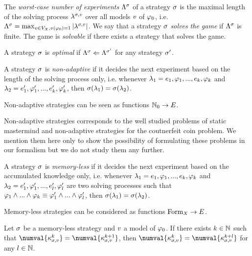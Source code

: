 
The \emph{worst-case number of experiments} $\Lambda^{\sigma}$
  of a strategy $\sigma$ is the maximal length of the solving process
  $\lambda^{\sigma,v}$ over all models $v$ of $\varphi_0$, i.e.
  $\Lambda^{\sigma} = \max_{v\in V_X, v(\varphi_0) = 1} |\lambda^{\sigma,v}|$.
We say that a strategy $\sigma$ \emph{solves the game} if $\Lambda^{\sigma}$ is finite.
The game is \emph{solvable} if there exists a strategy that solves the game.


\begin{definition}
A strategy $\sigma$ is \emph{optimal} if
  $\Lambda^{\sigma} <= \Lambda^{\sigma'}$ for any strategy $\sigma'$.
\end{definition}

\begin{definition}
A strategy $\sigma$ is \emph{non-adaptive} if it decides the next experiment
  based on the length of the solving process only, i.e.
  whenever
  $\lambda_1 = e_1, \varphi_1, ..., e_k, \varphi_k$ and
  $\lambda_2 = e'_1, \varphi'_1, ..., e'_k, \varphi'_k$,
  then $\sigma(\lambda_1) = \sigma(\lambda_2)$.

Non-adaptive strategies can be seen as functions $\mathbb{N}_0 -> E$.
\end{definition}

Non-adaptive strategies corresponds to the well studied problems of
  static mastermind and
  non-adaptive strategies for the coutnerfeit coin problem.
We mention them here only to show the possibility of formulating these problems
  in our formalism but we do not study them any further.

\begin{definition}
A strategy $\sigma$ is \emph{memory-less} if it decides the next experiment
  based on the accumulated knowledge only, i.e.
  whenever
  $\lambda_1 = e_1, \varphi_1, ..., e_k, \varphi_k$ and
  $\lambda_2 = e'_1, \varphi'_1, ..., e'_l, \varphi'_l$
  are two solving processes such that
  $ \varphi_1 \wedge ... \wedge \varphi_k \equiv \varphi'_1 \wedge ... \wedge \varphi'_l$,
  then
  $\sigma(\lambda_1) = \sigma(\lambda_2)$.

Memory-less strategies can be considered as functions $\textrm{Form}_X -> E$.
\end{definition}

\begin{lemma}
Let $\sigma$ be a memory-less strategy and $v$ a model of $\varphi_0$.
If there exists $k\in\mathbb{N}$ such that
  $\numval{\stgknow{\stg}{\val}{k}} = \numval{\stgknow{\stg}{\val}{k+1}}$,
 then
  $\numval{\stgknow{\stg}{\val}{k}} = \numval{\stgknow{\stg}{\val}{k+l}}$
 for any $l\in\mathbb{N}$.
\end{lemma}

